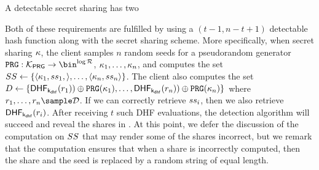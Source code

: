 \iffalse 
A detectable secret sharing has two

Both of these requirements are fulfilled by using a $(t-1, n - t + 1)$ detectable hash function along with the secret sharing scheme. More specifically, when secret sharing $\kappa$, the client samples $n$ random seeds for a pseudorandom generator $\prg: \prgKeySpace \rightarrow \bin^{\log \dhfRange}$,  
 $\kappa_1, \dots, \kappa_n$, and computes the set $SS \gets \{\langle \kappa_1, ss_{1}, \rangle, \dots, \langle \kappa_n, ss_{n} \rangle \}$. The client also computes the set $\dhfSet \assign \{\dhf[\dhfKey](\genericRand[1])) \oplus \prg(\genericSymmKey_1), \dots, \dhf[\dhfKey](\genericRand[n]))\oplus \prg(\genericSymmKey_n)\}$ where $\genericRand[1], \dots, \genericRand[n] \sample \dhfDomain$. If we can correctly retrieve $ss_{i}$, then we also retrieve $\dhf[\dhfKey](\genericRand[i])$. After receiving $t$ such DHF evaluations, the detection algorithm will succeed and reveal the shares in \ssSet. At this point, we defer the discussion of the computation on $SS$ that may render some of the shares incorrect, but we remark that the computation ensures that when a share is incorrectly computed, then the share and the seed is replaced by a random string of equal length.

